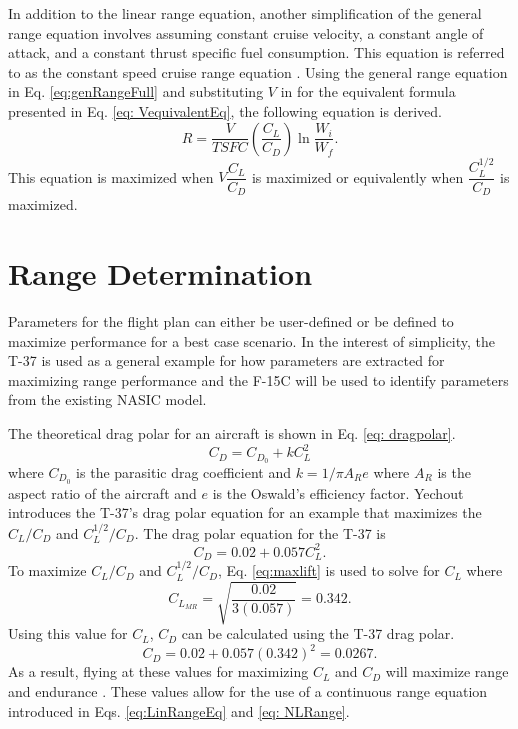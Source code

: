 In addition to the linear range equation, another simplification of the general range equation involves assuming constant cruise velocity, a constant angle of attack, and a constant thrust specific fuel consumption. This equation is referred to as the constant speed cruise range equation \cite{IntroACMechanics}. Using the general range equation in Eq. \ref{eq:genRangeFull} and substituting $V$ in for the equivalent formula presented in Eq. \ref{eq: VequivalentEq}, the following equation is derived.
\begin{equation}
    R = \dfrac{V}{TSFC}\left(\dfrac{C_L}{C_D}\right)\ln{\dfrac{W_i}{W_f}}.
    \label{eq: NLRange}
\end{equation}
This equation is maximized when $V\dfrac{C_L}{C_D}$ is maximized or equivalently when $\dfrac{C_L^{1/2}}{C_D}$ is maximized.

\section{Range Determination}
Parameters for the flight plan can either be user-defined or be defined to maximize performance for a best case scenario. In the interest of simplicity, the T-37 is used as a general example for how parameters are extracted for maximizing range performance and the F-15C will be used to identify parameters from the existing NASIC model. \par
The theoretical drag polar for an aircraft is shown in Eq. \ref{eq: dragpolar}.
\begin{equation}
    C_D = C_{D_0} + kC_L^2
    \label{eq: dragpolar}
\end{equation}
where $C_{D_0}$ is the parasitic drag coefficient and $k = 1/\pi A_Re$ where $A_R$ is the aspect ratio of the aircraft and $e$ is the Oswald's efficiency factor. Yechout \cite{IntroACMechanics} introduces the T-37's drag polar equation for an example that maximizes the $C_L/C_D$ and $C_L^{1/2}/C_D$. The drag polar equation for the T-37 is  
\begin{equation}
    C_D = 0.02 + 0.057C_L^2.
\end{equation}
To maximize $C_L/C_D$ and $C_L^{1/2}/C_D$, Eq. \ref{eq:maxlift} is used to solve for $C_L$ where
\begin{equation}
    C_{L_{MR}} = \sqrt{\dfrac{0.02}{3(0.057)}} = 0.342.
\end{equation}
Using this value for $C_L$, $C_D$ can be calculated using the T-37 drag polar.
\begin{equation}
    C_D = 0.02 + 0.057(0.342)^2 = 0.0267.
\end{equation}
As a result, flying at these values for maximizing $C_L$ and $C_D$ will maximize range and endurance \cite{IntrotoAero}. These values allow for the use of a continuous range equation introduced in Eqs. \ref{eq:LinRangeEq} and \ref{eq: NLRange}. \par
